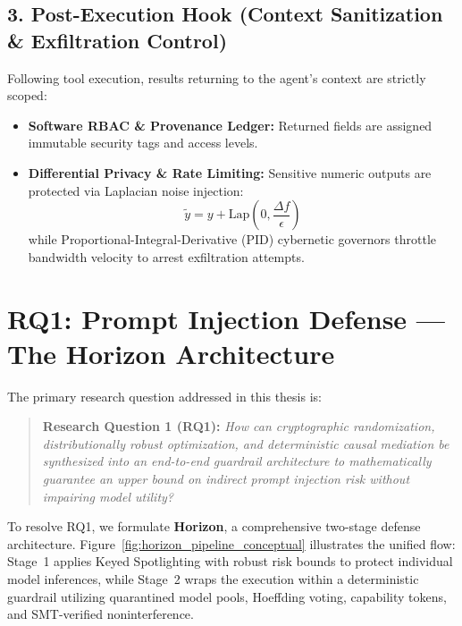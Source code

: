 \subsection{3. Post-Execution Hook (Context Sanitization \& Exfiltration Control)}
Following tool execution, results returning to the agent's context are strictly scoped:
\begin{itemize}
    \item \textbf{Software RBAC \& Provenance Ledger:} Returned fields are assigned immutable security tags and access levels.
    \item \textbf{Differential Privacy \& Rate Limiting:} Sensitive numeric outputs are protected via Laplacian noise injection:
    \begin{equation}
        \tilde{y} = y + \mathrm{Lap}\left(0, \frac{\Delta f}{\epsilon}\right)
    \end{equation}
    while Proportional-Integral-Derivative (PID) cybernetic governors throttle bandwidth velocity to arrest exfiltration attempts.
\end{itemize}

\section{RQ1: Prompt Injection Defense --- The Horizon Architecture}
\label{sec:meth_rq1_horizon}

The primary research question addressed in this thesis is:
\begin{quote}
\textbf{Research Question 1 (RQ1):} \emph{How can cryptographic randomization, distributionally robust optimization, and deterministic causal mediation be synthesized into an end-to-end guardrail architecture to mathematically guarantee an upper bound on indirect prompt injection risk without impairing model utility?}
\end{quote}

To resolve RQ1, we formulate \textbf{Horizon}, a comprehensive two-stage defense architecture. Figure~\ref{fig:horizon_pipeline_conceptual} illustrates the unified flow: Stage~1 applies Keyed Spotlighting with robust risk bounds to protect individual model inferences, while Stage~2 wraps the execution within a deterministic guardrail utilizing quarantined model pools, Hoeffding voting, capability tokens, and SMT-verified noninterference.


